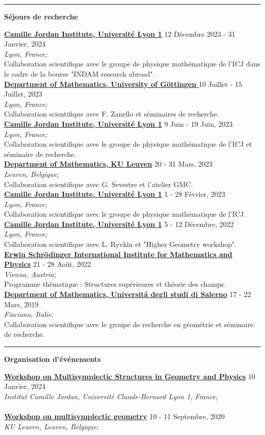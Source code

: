 \documentclass[a4paper]{article}
\newcommand{\block}[1]{\hrule \vspace{0.2cm} \textbf{\Large #1} \vspace{0.2cm}}
\newcommand{\voice}[5]{\href{#4}{\textbf{#1}} \hfill #2 \\ \textit{#3} \\ {\small #5} \vspace{0.2cm} \\}
\begin{document}
    \block{Séjours de recherche}

    
    \voice{Camille Jordan Institute, Université Lyon 1}
        {12 Décembre 2023 - 31 Janvier, 2024}
        {Lyon, France;}
        {None}       
        {Collaboration scientifique avec le groupe de physique mathématique de l'ICJ dans le cadre de la bourse "INDAM research abroad".}
    \voice{Department of Mathematics, University of Göttingen }
        {10 Juillet - 15 Juillet, 2023}
        {Lyon, France;}
        {None}       
        {Collaboration scientifique avec F. Zanello et séminaires de recherche.}
    \voice{Camille Jordan Institute, Université Lyon 1}
        {9 Juin - 19 Juin, 2023}
        {Lyon, France;}
        {None}       
        {Collaboration scientifique avec le groupe de physique mathématique de l'ICJ et séminaire de recherche.}
    \voice{Department of Mathematics, KU Leuven}
        {20 - 31 Mars, 2023}
        {Leuven, Belgique;}
        {None}       
        {Collaboration scientifique avec G. Sevestre et l'atelier GMC.}
    \voice{Camille Jordan Institute, Université Lyon 1}
        {1 - 28 Février, 2023}
        {Lyon, France;}
        {None}       
        {Collaboration scientifique avec le groupe de physique mathématique de l'ICJ.}
    \voice{Camille Jordan Institute, Université Lyon 1}
        {5 - 12 Décembre, 2022}
        {Lyon, France;}
        {None}       
        {Collaboration scientifique avec L. Ryvkin et "Higher Geometry workshop".}
    \voice{Erwin Schrödinger International Institute for Mathematics and Physics}
        {21 - 28 Août, 2022}
        {Vienna, Austria;}
        {https://www.esi.ac.at/events/e430/}       
        {Programme thématique : Structures supérieures et théorie des champs.}
    \voice{Department of Mathematics, Universit\'a degli studi di Salerno}
        {17 - 22 Mars, 2019}
        {Fisciano, Italie;}
        {http://geometria.dipmat.unisa.it/events.html}       
        {Collaboration scientifique avec le groupe de recherche en géométrie et séminaire de recherche.}

        




    \block{Organisation d'événements}

    
    \voice{Workshop on Multisymplectic Structures in Geometry and Physics}
        {10 Janvier, 2024}
        {Institut Camille Jordan, Université Claude-Bernard Lyon 1, France;}
        {https://math.gmu.edu/~cblacke/lyon.html}       
        {\vspace{-0.5cm}}
    \voice{Workshop on multisymplectic geometry}
        {10 - 11 Septembre, 2020}
        {KU Leuven, Leuven, Belgique;}
        {https://wis.kuleuven.be/events/multisymplectic}       
        {\vspace{-0.5cm}}
\end{document}
